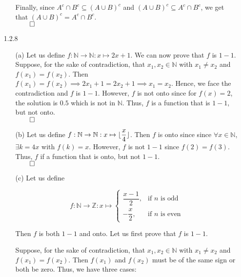 \documentclass[11pt]{article}
\DeclarePairedDelimiter\floor{\lfloor}{\rfloor}
\newcommand{\ints}{\mathbb{Z}}
\begin{document}
\begin{itemize}
\begin{itemize}
        Finally, since $A^c \cap B^c \subseteq (A \cup B)^c$ and $(A \cup B)^c
        \subseteq A^c \cap B^c$, we get that $(A \cup B)^c = A^c \cap B^c$.\\
        $\qed$
    \end{itemize}

    \item[1.2.8]
        \begin{itemize}
            \item[(a)]
            Let us define $f : \mathbb{N} \to \mathbb{N} : x \mapsto 2x + 1$.
            We can now prove that $f$ is $1 - 1$. Suppose, for the sake of
            contradiction, that $x_1, x_2 \in \mathbb{N}$ with $x_1 \neq x_2$
            and $f(x_1) = f(x_2)$. Then $f(x_1) = f(x_2) \implies 2x_1 + 1 =
            2x_2 + 1 \implies x_1 = x_2$. Hence, we face the contradiction and
            $f$ is $1 - 1$. However, $f$ is not onto since for $f(x) = 2$, the
            solution is $0.5$ which is not in $\mathbb{N}$. Thus, $f$ is a
            function that is $1 - 1$, but not onto.\\
            $\qed$

            \item[(b)]
            Let us define $f : \mathbb{N} \to \mathbb{N} : x \mapsto
            \floor{\dfrac{x}{4}}$. Then $f$ is onto since since $\forall x \in
            \mathbb{N}$, $\exists k = 4x$ with $f(k) = x$. However, $f$ is not
            $1 - 1$ since $f(2) = f(3)$. Thus, $f$ if a function that is onto,
            but not $1 - 1$.\\
            $\qed$

            \item[(c)]
            Let us define

            \begin{equation*}
                f : \mathbb{N} \to \ints : x \mapsto
                \begin{cases}
                    \dfrac{x - 1}{2}, & \text{if } n \text{ is odd}\\
                    -\dfrac{x}{2},    & \text{if } n \text{ is even}
                \end{cases}
            \end{equation*}

            Then $f$ is both $1 - 1$ and onto.
            Let us first prove that $f$ is $1 - 1$.

            Suppose, for the sake of contradiction, that $x_1, x_2 \in
            \mathbb{N}$ with $x_1 \neq x_2$ and $f(x_1) = f(x_2)$. Then
            $f(x_1)$ and $f(x_2)$ must be of the same sign or both be zero.
            Thus, we have three cases:


\end{itemize}
\end{itemize}
\end{document}
